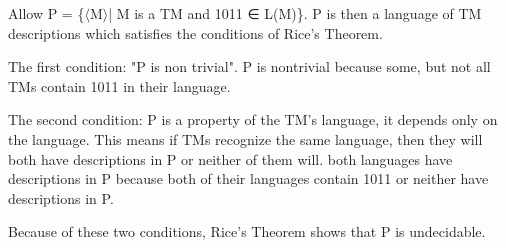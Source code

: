 \documentclass[12pt]{article}
\begin{document}
Allow P = \{$\langle$M$\rangle$| M is a TM and 1011 ∈ L(M)\}. P is then a language of TM descriptions which satisfies the conditions of Rice's Theorem. 

The first condition: "P is non trivial". P is nontrivial because some, but not all TMs contain 1011 in their language. 

The second condition: P is a property of the TM's language, it depends only on the language. This means if TMs recognize the same language, then they will both have descriptions in P or neither of them will.
both languages have descriptions in P because both of their languages contain 1011 or neither have descriptions in P.

Because of these two conditions, Rice's Theorem shows that P is undecidable. 
\end{document}
